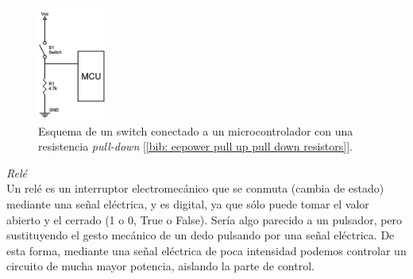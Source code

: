 \documentclass[12pt]{article}
\begin{document}
	\begin{figure}[h]
		\begin{center}
			\includegraphics[width=0.2\textwidth]{img/pull-down-resistor.png}
			\caption{Esquema de un switch conectado a un microcontrolador con una resistencia \textit{pull-down} [\ref{bib: eepower pull up pull down resistors}].}
			\label{Esquema resistencia pull-down}
		\end{center}
	\end{figure}

	\noindent \textit{Relé} \\
	
	\noindent Un relé es un interruptor electromecánico que se conmuta (cambia de estado) mediante una señal eléctrica, y es digital, ya que sólo puede tomar el valor abierto y el cerrado (1 o 0, True o False). Sería algo parecido a un pulsador, pero sustituyendo el gesto mecánico de un dedo pulsando por una señal eléctrica. De esta forma, mediante una señal eléctrica de poca intensidad podemos controlar un circuito de mucha mayor potencia, aislando la parte de control. \\
	
	\pagebreak
	
\end{document}
